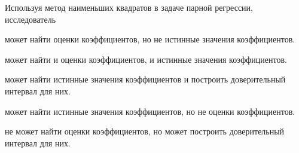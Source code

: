 
\begin{question}
Используя метод наименьших квадратов в задаче парной регрессии, исследователь
\begin{answerlist}
  \item может найти оценки коэффициентов, но не истинные значения коэффициентов.
  \item может найти и оценки коэффициентов, и истинные значения коэффициентов.
  \item может найти истинные значения коэффициентов и построить доверительный интервал для них.
  \item может найти истинные значения коэффициентов, но не оценки коэффициентов.
  \item не может найти оценки коэффициентов, но может построить доверительный интервал для них.
\end{answerlist}
\end{question}


